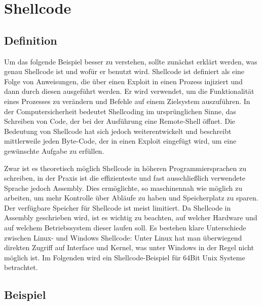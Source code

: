 \section{Shellcode} \label{sec:shellcode}
\subsection{Definition}
Um das folgende Beispiel besser zu verstehen, sollte zunächst erklärt werden, was genau Shellcode ist und wofür er benutzt wird.
Shellcode ist definiert als eine Folge von Anweisungen, die über einen Exploit in einen Prozess injiziert und
dann durch diesen ausgeführt werden. Er wird verwendet, um die Funktionalität eines Prozesses zu verändern und
Befehle auf einem Zielsystem auszuführen. In der Computersicherheit bedeutet Shellcoding im ursprünglichen Sinne,
das Schreiben von Code, der bei der Ausführung eine Remote-Shell öffnet. Die Bedeutung von Shellcode hat sich jedoch weiterentwickelt und
beschreibt mittlerweile jeden Byte-Code, der in einen Exploit eingefügt wird, um eine gewünschte Aufgabe zu erfüllen.

Zwar ist es theoretisch möglich Shellcode in höheren Programmiersprachen zu schreiben, in der Praxis ist die effizienteste und
fast ausschließlich verwendete Sprache jedoch Assembly. Dies ermöglichte, so maschinennah wie möglich zu arbeiten,
um mehr Kontrolle über Abläufe zu haben und Speicherplatz zu sparen. Der verfügbare Speicher für Shellcode ist meist limitiert.
Da Shellcode in Assembly geschrieben wird, ist es wichtig zu beachten, auf welcher Hardware und auf welchem Betriebssystem dieser laufen soll.
Es bestehen klare Unterschiede zwischen Linux- und Windows Shellcode: Unter Linux hat man überwiegend direkten Zugriff auf Interface und Kernel,
was unter Windows in der Regel nicht möglich ist. Im Folgenden wird ein Shellcode-Beispiel für 64Bit Unix Systeme betrachtet. \cite{tutorial1}

\subsection{Beispiel}

